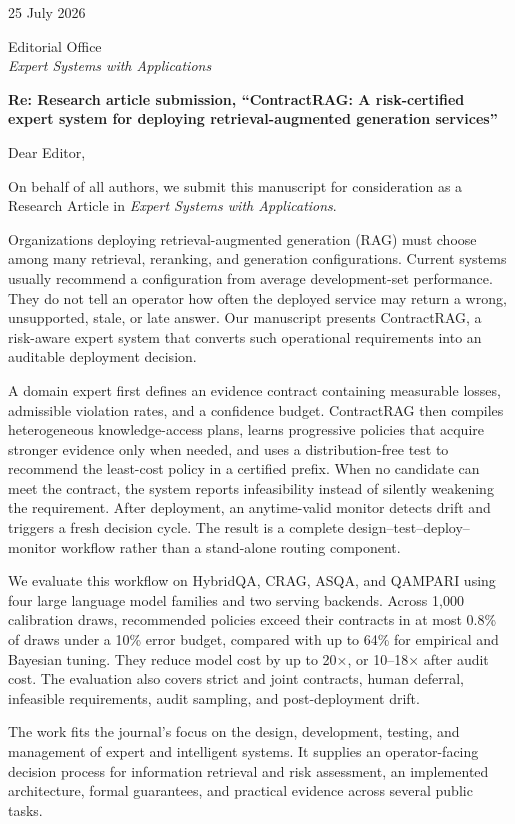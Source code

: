 \documentclass[11pt]{article}
\begin{document}
\raggedright
{}

25 July 2026

Editorial Office\\
\textit{Expert Systems with Applications}

\textbf{Re: Research article submission, ``ContractRAG: A
risk-certified expert system for deploying retrieval-augmented
generation services''}

Dear Editor,

On behalf of all authors, we submit this manuscript for consideration
as a Research Article in \textit{Expert Systems with Applications}.

Organizations deploying retrieval-augmented generation (RAG) must
choose among many retrieval, reranking, and generation configurations.
Current systems usually recommend a configuration from average
development-set performance. They do not tell an operator how often the
deployed service may return a wrong, unsupported, stale, or late
answer. Our manuscript presents ContractRAG, a risk-aware expert system
that converts such operational requirements into an auditable
deployment decision.

A domain expert first defines an evidence contract containing measurable
losses, admissible violation rates, and a confidence budget. ContractRAG
then compiles heterogeneous knowledge-access plans, learns progressive
policies that acquire stronger evidence only when needed, and uses a
distribution-free test to recommend the least-cost policy in a
certified prefix. When no candidate can meet the contract, the system
reports infeasibility instead of silently weakening the requirement.
After deployment, an anytime-valid monitor detects drift and triggers a
fresh decision cycle. The result is a complete design--test--deploy--monitor
workflow rather than a stand-alone routing component.

We evaluate this workflow on HybridQA, CRAG, ASQA, and QAMPARI using
four large language model families and two serving backends. Across
1,000 calibration draws, recommended policies exceed their contracts
in at most 0.8\% of draws under a 10\% error budget, compared with up to
64\% for empirical and Bayesian tuning. They reduce model cost by up to
20$\times$, or 10--18$\times$ after audit cost. The evaluation also
covers strict and joint contracts, human deferral, infeasible
requirements, audit sampling, and post-deployment drift.

The work fits the journal's focus on the design, development, testing,
and management of expert and intelligent systems. It supplies an
operator-facing decision process for information retrieval and risk
assessment, an implemented architecture, formal guarantees, and
practical evidence across several public tasks.
\end{document}
